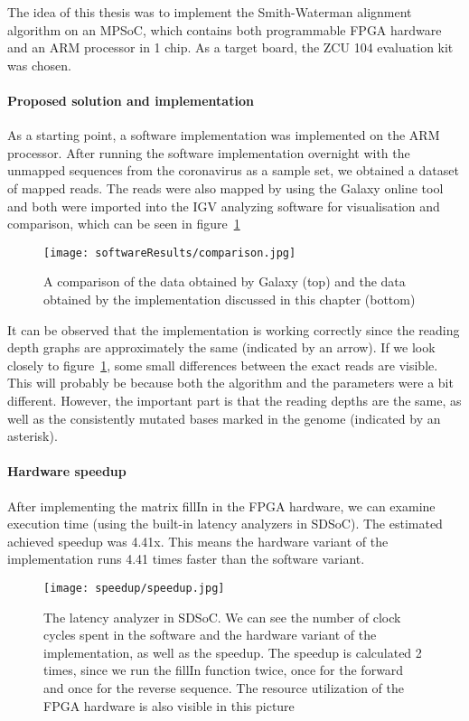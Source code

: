 The idea of this thesis was to implement the Smith-Waterman alignment algorithm on an MPSoC, which contains both programmable FPGA hardware and an ARM processor in 1 chip. As a target board, the ZCU 104 evaluation kit was chosen.

\paragraph{Proposed solution and implementation}

As a starting point, a software implementation was implemented on the ARM processor. After running the software implementation overnight with the unmapped sequences from the coronavirus as a sample set, we obtained a dataset of mapped reads. The reads were also mapped by using the Galaxy online tool~\cite{} and both were imported into the IGV analyzing software for visualisation and comparison, which can be seen in figure~\ref{fig:IGVcomparisonConcl}

\begin{figure}[H]
	\centering
	\texttt{[image: softwareResults/comparison.jpg]}
	\caption{A comparison of the data obtained by Galaxy (top) and the data obtained by the implementation discussed in this chapter (bottom)}
	\label{fig:IGVcomparisonConcl}
\end{figure}

It can be observed that the implementation is working correctly since the reading depth graphs are approximately the same (indicated by an arrow). If we look closely to figure~\ref{fig:IGVcomparisonConcl}, some small differences between the exact reads are visible. This will probably be because both the algorithm and the parameters were a bit different. However, the important part is that the reading depths are the same, as well as the consistently mutated bases marked in the genome (indicated by an asterisk).

\paragraph{Hardware speedup}

After implementing the matrix fillIn in the FPGA hardware, we can examine execution time (using the built-in latency analyzers in SDSoC). The estimated achieved speedup was 4.41x. This means the hardware variant of the implementation runs 4.41 times faster than the software variant.

\begin{figure}[H]
	\centering
	\texttt{[image: speedup/speedup.jpg]}
	\caption{The latency analyzer in SDSoC. We can see the number of clock cycles spent in the software and the hardware variant of the implementation, as well as the speedup. The speedup is calculated 2 times, since we run the fillIn function twice, once for the forward and once for the reverse sequence. The resource utilization of the FPGA hardware is also visible in this picture}
	\label{fig:speedupConcl}
\end{figure}





